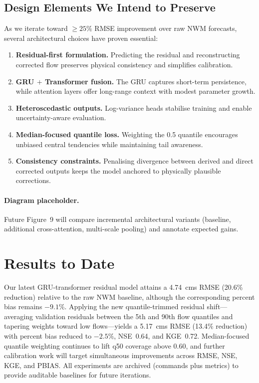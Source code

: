 \documentclass[draft]{agujournal2019}
\begin{document}
\subsection{Design Elements We Intend to Preserve}
As we iterate toward \(\geq 25\%\) RMSE improvement over raw NWM forecasts, several architectural choices have proven essential:
\begin{enumerate}
    \item \textbf{Residual-first formulation.} Predicting the residual and reconstructing corrected flow preserves physical consistency and simplifies calibration.
    \item \textbf{GRU $+$ Transformer fusion.} The GRU captures short-term persistence, while attention layers offer long-range context with modest parameter growth.
    \item \textbf{Heteroscedastic outputs.} Log-variance heads stabilise training and enable uncertainty-aware evaluation.
    \item \textbf{Median-focused quantile loss.} Weighting the 0.5 quantile encourages unbiased central tendencies while maintaining tail awareness.
    \item \textbf{Consistency constraints.} Penalising divergence between derived and direct corrected outputs keeps the model anchored to physically plausible corrections.
\end{enumerate}

\paragraph{Diagram placeholder.} Future Figure~9 will compare incremental architectural variants (baseline, additional cross-attention, multi-scale pooling) and annotate expected gains.

\section{Results to Date}
Our latest GRU-transformer residual model attains a 4.74~cms RMSE (20.6\% reduction) relative to the raw NWM baseline, although the corresponding percent bias remains \(-9.1\%\). Applying the new quantile-trimmed residual shift—averaging validation residuals between the 5th and 90th flow quantiles and tapering weights toward low flows—yields a 5.17~cms RMSE (13.4\% reduction) with percent bias reduced to \(-2.5\%\), NSE~0.64, and KGE~0.72. Median-focused quantile weighting continues to lift q50 coverage above 0.60, and further calibration work will target simultaneous improvements across RMSE, NSE, KGE, and PBIAS. All experiments are archived (commands plus metrics) to provide auditable baselines for future iterations.
\end{document}
